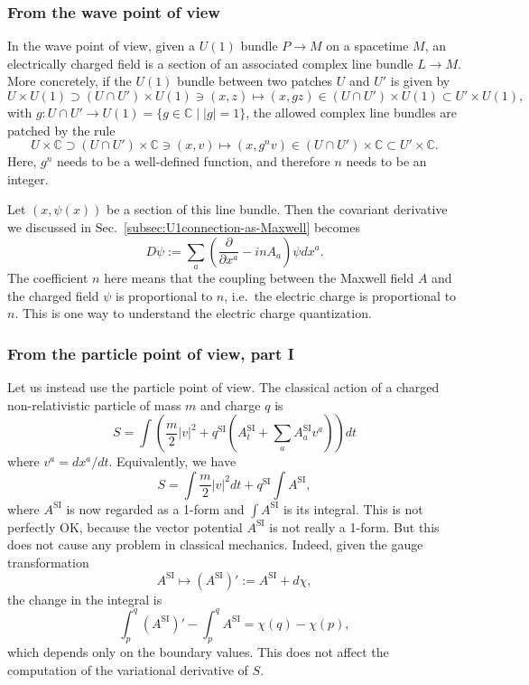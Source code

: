 \documentclass[12pt]{article}
\numberwithin{equation}{section}
\numberwithin{figure}{section}
\theoremstyle{remark}
\def\bC{\mathbb{C}}
\begin{document}
\subsubsection{From the wave point of view}
In the wave point of view, given a $U(1)$ bundle $P\to M$ on a spacetime $M$,
an electrically charged field is a section of an associated complex line bundle $L\to M$.
More concretely, if  the $U(1)$ bundle between two patches $U$ and $U'$ is given by \begin{equation}
U\times U(1) \supset (U\cap U')\times U(1) \ni (x,z) 
\mapsto (x,gz) \in (U\cap U')\times U(1)\subset U'\times U(1),
\end{equation} with $g:U\cap U' \to U(1)=\{g\in \bC \mid |g|=1\}$,
the allowed complex line bundles are patched by the rule \begin{equation}
U\times \bC \supset (U\cap U')\times \bC \ni (x,v) 
\mapsto (x,g^n v) \in (U\cap U')\times \bC\subset U'\times \bC.
\end{equation}
Here, $g^n$ needs to be a well-defined function, and therefore $n$ needs to be an integer. 

Let $(x,\psi(x))$ be a section of this line bundle. Then the covariant derivative we discussed in Sec.~\ref{subsec:U1connection-as-Maxwell} becomes \begin{equation}
D\psi := \sum_a\left(\frac{\partial}{\partial x^a} - i n A_a\right)\psi dx^a.
\end{equation}
The coefficient $n$ here means that the coupling between the Maxwell field $A$ and the charged field $\psi$ is proportional to $n$, 
i.e.~the electric charge is proportional to $n$. 
This is one way to understand the electric charge quantization.

\subsubsection{From the particle point of view, part I}
Let us instead use the particle point of view.
The classical action of a charged non-relativistic particle of mass $m$ and charge $q$ is \begin{equation}
S = \int \left(\frac m2 |v|^2 + q^\text{SI} (A^\text{SI}_t + \sum_a A^\text{SI}_a v^a) \right)dt 
\end{equation} where $v^a= dx^a/dt$.
Equivalently, we have \begin{equation}
S = \int \frac m2 |v|^2 dt + q^\text{SI} \int  A^\text{SI},
\end{equation} where $A^\text{SI}$ is now regarded as a 1-form and $\int A^\text{SI}$ is its integral.
This is not perfectly OK, because the vector potential $A^\text{SI}$ is not really a 1-form.
But this does not cause any problem in classical mechanics.
Indeed, given the gauge transformation \begin{equation}
A^\text{SI} \mapsto (A^\text{SI})':=A^\text{SI} + d\chi,
\end{equation} the change in the  integral is  \begin{equation}
\int_p^q (A^\text{SI})'-\int_p^q A^\text{SI} =  \chi(q)-\chi(p),
\end{equation} which depends only on the boundary values.
This does not affect the computation of the variational derivative of $S$.
\end{document}
